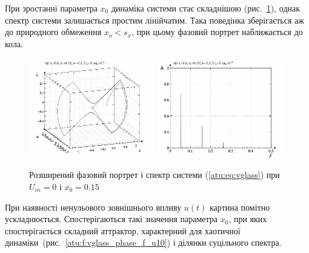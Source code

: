При зростанні параметра
$ x_0 $ динаміка системи стає складнішою (рис.~\ref{atu:f:vglass_phase_f_u01}),
однак спектр системи залишається простим лінійчатим. Така
поведінка зберігається аж до природного обмеження
$ x_o <s_x $, при цьому фазовий портрет наближається до кола.

\begin{figure}[ht!]
\begin{center}
  \includegraphics[width=0.49\textwidth]{p/cha/vg/vg_0-p_phe_0x00_0x70_0x15.png}
  \hfill
  \includegraphics[width=0.49\textwidth]{p/cha/vg/vg_fft-p_f_0x00_0x70_0x15.png}
\end{center}
\caption{Розширений фазовий портрет і спектр системи (\ref{atu:eq:vglass}) при $ U_{in} = 0 $ і $ x_0 = 0.15 $}
\label{atu:f:vglass_phase_f_u01}
\end{figure}

При наявності ненульового зовнішнього впливу
$u(t) $ картина помітно ускладнюється. Спостерігаються такі
значення параметра
$ x_0 $, при яких спостерігається складний аттрактор, характерний
для хаотичної динаміки~(рис.~\ref{atu:f:vglass_phase_f_u10}) і ділянки
суцільного спектра.

